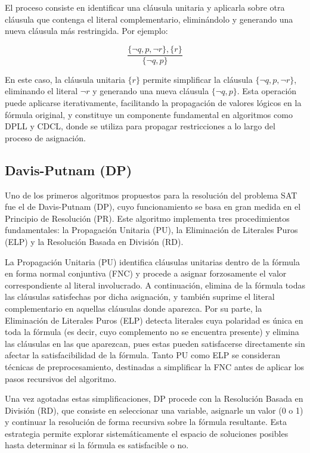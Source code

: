 El proceso consiste en identificar una cl\'ausula unitaria y aplicarla sobre otra cl\'ausula que contenga el literal complementario, elimin\'andolo y generando una nueva cl\'ausula m\'as restringida. Por ejemplo:

\begin{equation*}
\dfrac{\{\neg q, p, \neg r\},\{r\}}{\{\neg q, p\}}
\end{equation*}

En este caso, la cl\'{a}usula unitaria \( \{r\} \) permite simplificar la cl\'{a}usula \( \{\neg q, p, \neg r\} \), eliminando el literal \( \neg r \) y generando una nueva cl\'{a}usula \( \{\neg q, p\} \). Esta operaci\'{o}n puede aplicarse iterativamente, facilitando la propagaci\'{o}n de valores l\'{o}gicos en la f\'{o}rmula original, y constituye un componente fundamental en algoritmos como DPLL y CDCL, donde se utiliza para propagar restricciones a lo largo del proceso de asignaci\'{o}n.

\subsection{Davis-Putnam (DP)}
Uno de los primeros algoritmos propuestos para la resolución del problema SAT fue el de Davis-Putnam (DP), cuyo funcionamiento se basa en gran medida en el Principio de Resolución (PR). Este algoritmo implementa tres procedimientos fundamentales: la Propagación Unitaria (PU), la Eliminación de Literales Puros (ELP) y la Resolución Basada en División (RD).

La Propagación Unitaria (PU) identifica cláusulas unitarias dentro de la fórmula en forma normal conjuntiva (FNC) y procede a asignar forzosamente el valor correspondiente al literal involucrado. A continuación, elimina de la fórmula todas las cláusulas satisfechas por dicha asignación, y también suprime el literal complementario en aquellas cláusulas donde aparezca. Por su parte, la Eliminación de Literales Puros (ELP) detecta literales cuya polaridad es única en toda la fórmula (es decir, cuyo complemento no se encuentra presente) y elimina las cláusulas en las que aparezcan, pues estas pueden satisfacerse directamente sin afectar la satisfacibilidad de la fórmula. Tanto PU como ELP se consideran técnicas de preprocesamiento, destinadas a simplificar la FNC antes de aplicar los pasos recursivos del algoritmo.

Una vez agotadas estas simplificaciones, DP procede con la Resolución Basada en División (RD), que consiste en seleccionar una variable, asignarle un valor (0 o 1) y continuar la resolución de forma recursiva sobre la fórmula resultante. Esta estrategia permite explorar sistemáticamente el espacio de soluciones posibles hasta determinar si la fórmula es satisfacible o no.

